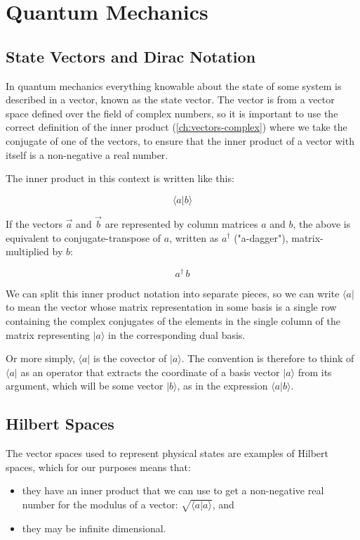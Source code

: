 \chapter{Quantum Mechanics} \label{ch:qm}

\section{State Vectors and Dirac Notation}

In quantum mechanics everything knowable about the state of some system is described in a vector, known as the state vector. The vector is from a vector space defined over the field of complex numbers, so it is important to use the correct definition of the inner product (\ref{ch:vectors-complex}) where we take the conjugate of one of the vectors, to ensure that the inner product of a vector with itself is a non-negative a real number.

The inner product in this context is written like this:

$$\langle a|b \rangle$$

If the vectors $\vec{a}$ and $\vec{b}$ are represented by column matrices $a$ and $b$, the above is equivalent to conjugate-transpose of $a$, written as $a^{\dagger}$ ("a-dagger"), matrix-multiplied by $b$:

$$a^{\dagger} \, b$$

We can split this inner product notation into separate pieces, so we can write $\langle a|$ to mean the vector whose matrix representation in some basis is a single row containing the complex conjugates of the elements in the single column of the matrix representing $|a \rangle$ in the corresponding dual basis.

Or more simply, $\langle a|$ is the covector of $|a \rangle$. The convention is therefore to think of $\langle a|$ as an operator that extracts the coordinate of a basis vector $|a \rangle$ from its argument, which will be some vector $|b \rangle$, as in the expression $\langle a|b \rangle$.

\section{Hilbert Spaces}

The vector spaces used to represent physical states are examples of Hilbert spaces, which for our purposes means that:

\begin{itemize}
  \item they have an inner product that we can use to get a non-negative real number for the modulus of a vector: $\sqrt{\langle a|a \rangle}$, and 
  \item they may be infinite dimensional.
\end{itemize}

